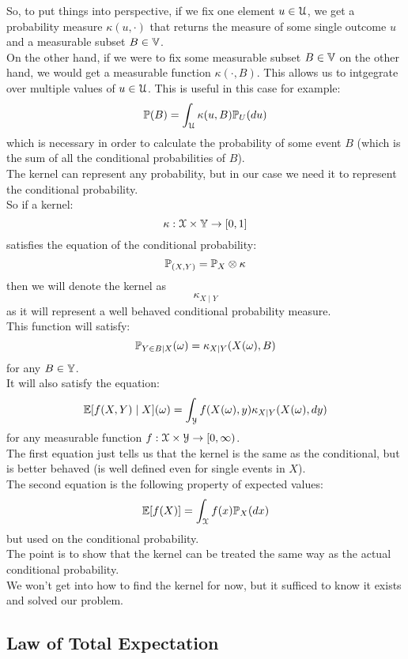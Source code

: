 \documentclass[12pt]{article}
\begin{document}
So, to put things into perspective,
if we fix one element $u \in \mathcal{U}$,
we get a probability measure
$\kappa(u, \cdot)$
that returns the measure of
some single outcome $u$
and a measurable subset $B \in \mathbb{V}$. \\

On the other hand,
if we were to fix some measurable
subset $B \in \mathbb{V}$ on the other hand,
we would get a measurable function
$\kappa(\cdot, B)$.
This allows us to intgegrate over
multiple values of $u \in \mathcal{U}$.
This is useful in this case for example:
\[ \mathbb{P}(B) = \int_{\mathcal{U}} \kappa(u, B)
\mathbb{P}_U(du) \]
which is necessary in order
to calculate the probability
of some event $B$
(which is the sum of all
the conditional probabilities
of $B$). \\

The kernel can represent any probability,
but in our case we need it to represent
the conditional probability. \\
So if a kernel:
\[ \kappa: \mathcal{X} \times \mathbb{Y}
\to [0, 1] \]
satisfies the equation
of the conditional probability:
\[ \mathbb{P}_{(X, Y)}
= \mathbb{P}_{X} \otimes \kappa \]
then we will denote the kernel as
\[ \kappa_{X \mid Y} \]
as it will represent a well behaved
conditional probability measure. \\
This function will satisfy:
\[ \mathbb{P}_{Y \in B \mid X}(\omega)
= \kappa_{X \mid Y}(X(\omega), B) \]
for any $B \in \mathbb{Y}$. \\
It will also satisfy the equation:
\[ \mathbb{E}[f(X, Y) \mid X](\omega)
= \int_{\mathcal{Y}} f(X(\omega), y)
\kappa_{X \mid Y}(X(\omega), dy) \]
for any measurable function
$f: \mathcal{X} \times \mathcal{Y} 
\to [0, \infty)$. \\

The first equation just tells us that
the kernel is the same as the conditional,
but is better behaved
(is well defined even for
single events in $X$). \\
The second equation is the following
property of expected values:
\[ \mathbb{E}[f(X)] 
= \int_{\mathcal{X}}f(x)\mathbb{P}_X(dx) \]
but used on the conditional probability. \\
The point is to show that the kernel
can be treated the same way as the
actual conditional probability. \\

We won't get into how to find the
kernel for now, but it sufficed to know
it exists and solved our problem. \\

\newpage

\subsection*{Law of Total Expectation}
\end{document}
